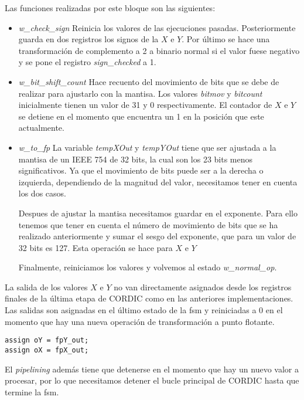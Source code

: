 Las funciones realizadas por este bloque son las siguientes:

\begin{itemize}	
	\item \textit{w\_check\_sign} Reinicia los valores de las ejecuciones pasadas. Posteriormente guarda en dos registros los signos de la $X$ e $Y$. Por último se hace una transformación de complemento a 2 a binario normal si el valor fuese negativo y se pone el registro \textit{sign\_checked} a 1.
	
	\item \textit{w\_bit\_shift\_count} Hace recuento del movimiento de bits que se debe de realizar para ajustarlo con la mantisa. Los valores \textit{bitmov} y \textit{bitcount} inicialmente tienen un valor de 31 y 0 respectivamente. El contador de $X$ e $Y$ se detiene en el momento que encuentra un 1 en la posición que este actualmente.
	
	\item \textit{w\_to\_fp} La variable \textit{tempXOut} y \textit{tempYOut} tiene que ser ajustada a la mantisa de un IEEE 754 de 32 bits, la cual son los 23 bits menos significativos. Ya que el movimiento de bits puede ser a la derecha o izquierda, dependiendo de la magnitud del valor, necesitamos tener en cuenta los dos casos.
	
	Despues de ajustar la mantisa necesitamos guardar en el exponente. Para ello tenemos que tener en cuenta el número de movimiento de bits que se ha realizado anteriormente y sumar el sesgo del exponente, que para un valor de 32 bits es 127. Esta operación se hace para $X$ e $Y$
	
	Finalmente, reiniciamos los valores y volvemos al estado \textit{w\_normal\_op}.
\end{itemize}

La salida de los valores $X$ e $Y$ no van directamente asignados desde los registros finales de la última etapa de CORDIC como en las anteriores implementaciones. Las salidas son asignadas en el último estado de la \gls{fsm} y reiniciadas a 0 en el momento que hay una nueva operación de transformación a punto flotante.

\begin{lstlisting}[caption={Cambio en las asignaciones de las salidas de CORDIC en punto flotante}]
assign oY = fpY_out;
assign oX = fpX_out;
\end{lstlisting}

El \textit{pipelining} además tiene que detenerse en el momento que hay un nuevo valor a procesar, por lo que necesitamos detener el bucle principal de CORDIC hasta que termine la \gls{fsm}.


